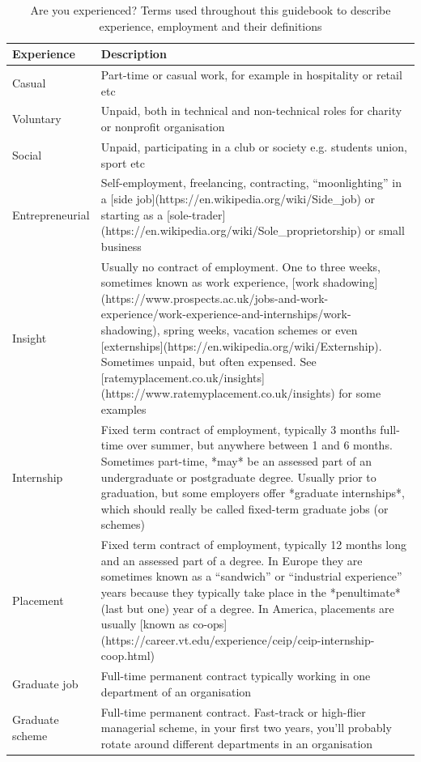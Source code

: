 \documentclass[
]{book}
\begin{document}
\begin{table}
\caption{\label{tab:jobterms}Are you experienced? Terms used throughout this guidebook to describe experience, employment and their definitions}
\centering
\begin{tabular}[t]{ll}
\toprule
Experience & Description\\
\midrule
Casual & Part-time or casual work, for example in hospitality or retail etc\\
Voluntary & Unpaid, both in technical and non-technical roles for charity or nonprofit organisation\\
Social & Unpaid, participating in a club or society e.g. students union, sport etc\\
Entrepreneurial & Self-employment, freelancing, contracting, “moonlighting” in a [side job](https://en.wikipedia.org/wiki/Side\_job) or starting as a [sole-trader](https://en.wikipedia.org/wiki/Sole\_proprietorship) or small business\\
Insight & Usually no contract of employment. One to three weeks, sometimes known as work experience, [work shadowing](https://www.prospects.ac.uk/jobs-and-work-experience/work-experience-and-internships/work-shadowing), spring weeks, vacation schemes or even [externships](https://en.wikipedia.org/wiki/Externship). Sometimes unpaid, but often expensed. See [ratemyplacement.co.uk/insights](https://www.ratemyplacement.co.uk/insights) for some examples\\
\addlinespace
Internship & Fixed term contract of employment, typically 3 months full-time over summer, but anywhere between 1 and 6 months. Sometimes part-time, *may* be an assessed part of an undergraduate or postgraduate degree. Usually prior to graduation, but some employers offer *graduate internships*, which should really be called fixed-term graduate jobs (or schemes)\\
Placement & Fixed term contract of employment, typically 12 months long and an assessed part of a degree. In Europe they are sometimes known as a “sandwich” or “industrial experience” years because they typically take place in the *penultimate* (last but one) year of a degree. In America, placements are usually [known as co-ops](https://career.vt.edu/experience/ceip/ceip-internship-coop.html)\\
Graduate job & Full-time permanent contract typically working in one department of an organisation\\
Graduate scheme & Full-time permanent contract. Fast-track or high-flier managerial scheme, in your first two years, you'll probably rotate around different departments in an organisation\\
\bottomrule
\end{tabular}
\end{table}
\end{document}
